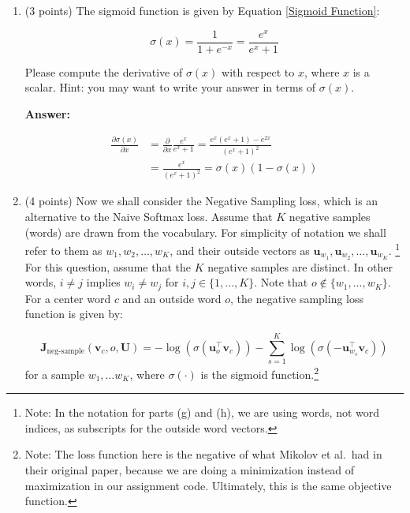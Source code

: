 \documentclass{article}
\newenvironment{answer}{
        {\bf Answer:} \sf \begingroup\color{red}
    }{\endgroup}%
\begin{document}
\begin{enumerate}
        \item (3 points) The sigmoid function is given by Equation \ref{Sigmoid Function}:

        \begin{equation}
            \label{Sigmoid Function}
            \sigma (x) = \frac{1}{1 + e^{-x}} = \frac{e^{x}}{e^{x} + 1}
        \end{equation}

        Please compute the derivative of $\sigma(x)$ with respect to $x$, where $x$ is a scalar. Hint: you may want to write your answer in terms of $\sigma(x)$.

        \begin{shaded}
            \begin{answer}
                \[
                    \begin{aligned}
                        \frac{\partial \sigma(x)}{\partial x} &= \frac{\partial}{\partial x} \frac{e^x}{e^x+1} = \frac{e^x(e^x+1)-e^{2x}}{(e^x+1)^2} \\
                        &= \frac{e^x}{(e^x+1)^2} = \sigma(x)(1-\sigma(x))
                    \end{aligned}
                \]
            \end{answer}
        \end{shaded}

        \item (4 points) Now we shall consider the Negative Sampling loss, which is an alternative to the Naive Softmax loss. Assume that $K$ negative samples (words) are drawn from the vocabulary. For simplicity of notation we shall refer to them as $w_1, w_2, \dots, w_K$, and their outside vectors as $\bm u_{w_1}, \bm u_{w_2}, \dots, \bm u_{w_K}$. \footnote{Note: In the notation for parts (g) and (h), we are using words, not word indices, as subscripts for the outside word vectors.} For this question, assume that the $K$ negative samples are distinct. In other words, $i\neq j$ implies $w_i\neq w_j$ for $i,j\in\{1,\dots,K\}$.
        Note that $o\notin\{w_1, \dots, w_K\}$.
        For a center word $c$ and an outside word $o$, the negative sampling loss function is given by:

        \begin{equation}
            \bm J_{\text{neg-sample}}(\bm v_c, o, \bm U) = -\log(\sigma(\bm u_o^\top \bm v_c)) - \sum_{s=1}^K \log(\sigma(-\bm u_{w_s}^\top \bm v_c))
        \end{equation}
        for a sample $w_1, \ldots w_K$, where $\sigma(\cdot)$ is the sigmoid function.\footnote{Note: The loss function here is the negative of what Mikolov et al.\ had in their original paper, because we are doing a minimization instead of maximization in our assignment code. Ultimately, this is the same objective function.}


\end{enumerate}
\end{document}
